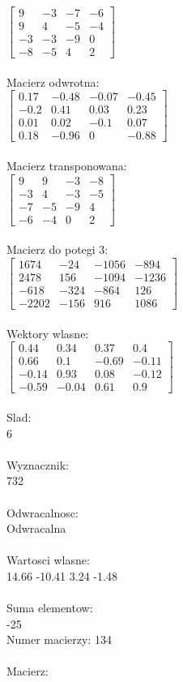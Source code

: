\documentclass[a4paper,12pt]{article}
\begin{document}
$\begin{bmatrix} 9&-3&-7&-6\\9&4&-5&-4\\-3&-3&-9&0\\-8&-5&4&2 \end{bmatrix}$
\\
\\
Macierz odwrotna:\\

$\begin{bmatrix} 0.17&-0.48&-0.07&-0.45\\-0.2&0.41&0.03&0.23\\0.01&0.02&-0.1&0.07\\0.18&-0.96&0&-0.88 \end{bmatrix}$
\\
\\
Macierz transponowana:\\

$\begin{bmatrix} 9&9&-3&-8\\-3&4&-3&-5\\-7&-5&-9&4\\-6&-4&0&2 \end{bmatrix}$
\\
\\
Macierz do potegi 3:\\

$\begin{bmatrix} 1674&-24&-1056&-894\\2478&156&-1094&-1236\\-618&-324&-864&126\\-2202&-156&916&1086 \end{bmatrix}$
\\
\\
Wektory wlasne:\\

$\begin{bmatrix} 0.44&0.34&0.37&0.4\\0.66&0.1&-0.69&-0.11\\-0.14&0.93&0.08&-0.12\\-0.59&-0.04&0.61&0.9 \end{bmatrix}$
\\
\\
Slad:\\
6
\\
\\
Wyznacznik:\\
732
\\
\\
Odwracalnosc:\\
Odwracalna
\\
\\
Wartosci wlasne:\\
14.66 -10.41 3.24 -1.48
\\
\\
Suma elementow:\\
-25
\\
\newpage
Numer macierzy:
134
\\
\\
Macierz:\\
\end{document}
